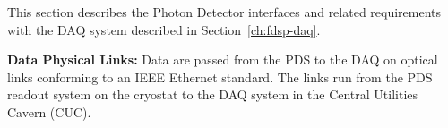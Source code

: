 






This section describes the Photon Detector interfaces and related requirements with the DAQ system described in Section~\ref{ch:fdsp-daq}.

\hspace{0.5cm}\textbf{Data Physical Links: }Data are passed from the PDS to the DAQ on optical links conforming to an IEEE Ethernet standard. The links run from the PDS readout system on the cryostat to the DAQ system in the Central Utilities Cavern (CUC).

